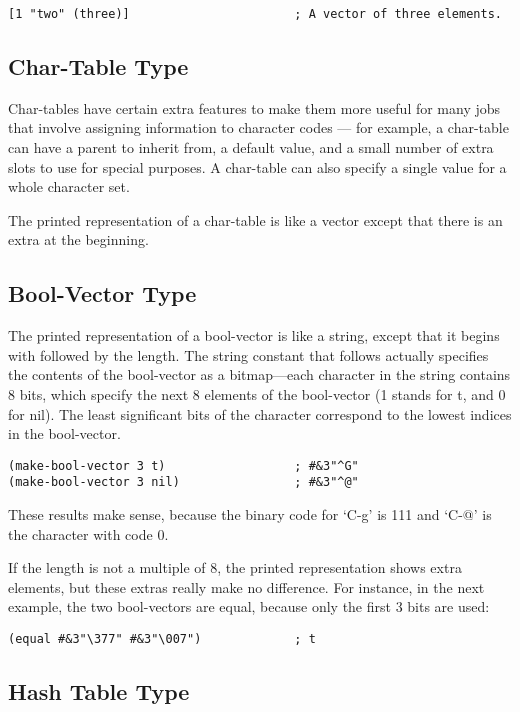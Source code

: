 \begin{lstlisting}
[1 "two" (three)]                       ; A vector of three elements.
\end{lstlisting}

\subsection{Char-Table Type}
\label{sec:char-table-type}

Char-tables have certain extra features to make them more useful for many jobs that involve assigning information to character codes — for example, a char-table can have a parent to inherit from, a default value, and a small number of extra slots to use for special purposes.
A char-table can also specify a single value for a whole character set.

The printed representation of a char-table is like a vector except that there is an extra \keyword{\#\textasciicircum{}} at the beginning.


\subsection{Bool-Vector Type}
\label{sec:bool-vector-type}

The printed representation of a bool-vector is like a string, except that it begins with \keyword{\#\&} followed by the length.
The string constant that follows actually specifies the contents of the bool-vector as a bitmap—each character in the string contains 8 bits, which specify the next 8 elements of the bool-vector (1 stands for t, and 0 for nil).
The least significant bits of the character correspond to the lowest indices in the bool-vector.
\begin{lstlisting}
(make-bool-vector 3 t)                  ; #&3"^G"
(make-bool-vector 3 nil)                ; #&3"^@"
\end{lstlisting}
These results make sense, because the binary code for ‘C-g’ is 111 and ‘C-@’ is the character with code 0.


If the length is not a multiple of 8, the printed representation shows extra elements, but these extras really make no difference.
For instance, in the next example, the two bool-vectors are equal, because only the first 3 bits are used:
\begin{lstlisting}
(equal #&3"\377" #&3"\007")             ; t
\end{lstlisting}


\subsection{Hash Table Type}
\label{sec:hash-table-type}

